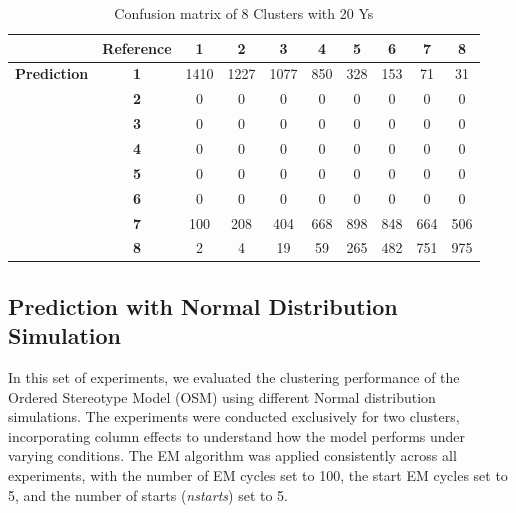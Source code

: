 \documentclass{article}
\begin{document}
\begin{table}[htbp!]
  \centering


  \begin{minipage}{0.8\textwidth}
    \centering
    \begin{tabular}{c|c|c|c|c|c|c|c|c|c}
      & \textbf{Reference} & \textbf{1} & \textbf{2} & \textbf{3} & \textbf{4} & \textbf{5} & \textbf{6} & \textbf{7} & \textbf{8} \\
      \hline
      \textbf{Prediction} & \textbf{1} & 1410 & 1227 & 1077 & 850 & 328 & 153 & 71 & 31 \\
                          & \textbf{2} & 0 & 0 & 0 & 0 & 0 & 0 & 0 & 0 \\
                          & \textbf{3} & 0 & 0 & 0 & 0 & 0 & 0 & 0 & 0 \\
                          & \textbf{4} & 0 & 0 & 0 & 0 & 0 & 0 & 0 & 0 \\
                          & \textbf{5} & 0 & 0 & 0 & 0 & 0 & 0 & 0 & 0 \\
                          & \textbf{6} & 0 & 0 & 0 & 0 & 0 & 0 & 0 & 0 \\
                          & \textbf{7} & 100 & 208 & 404 & 668 & 898 & 848 & 664 & 506 \\
                          & \textbf{8} & 2 & 4 & 19 & 59 & 265 & 482 & 751 & 975 \\
    \end{tabular}
    \caption{Confusion matrix of 8 Clusters with 20 Ys}
    \label{tab:8_clu}
  \end{minipage}

\end{table}

\clearpage

\subsection{Prediction with Normal Distribution Simulation}

In this set of experiments, we evaluated the clustering performance of the Ordered Stereotype Model (OSM) using different Normal distribution simulations. 
The experiments were conducted exclusively for two clusters, incorporating column effects to understand how the model performs under varying conditions. 
The EM algorithm was applied consistently across all experiments, with the number of EM cycles set to 100, the start EM cycles set to 5, and the number of starts (\textit{nstarts}) set to 5.
\end{document}
